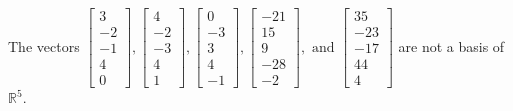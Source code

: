 \begin{exercise}
\begin{exerciseStatement}
  \end{exerciseStatement}
  \begin{exerciseAnswer}
   The vectors \(\left[\begin{array}{r}
3 \\
-2 \\
-1 \\
4 \\
0
\end{array}\right] , \left[\begin{array}{r}
4 \\
-2 \\
-3 \\
4 \\
1
\end{array}\right] , \left[\begin{array}{r}
0 \\
-3 \\
3 \\
4 \\
-1
\end{array}\right] , \left[\begin{array}{r}
-21 \\
15 \\
9 \\
-28 \\
-2
\end{array}\right] , \text{ and } \left[\begin{array}{r}
35 \\
-23 \\
-17 \\
44 \\
4
\end{array}\right]\) 
  	 are not  a basis of \(\mathbb{R}^5\).
  


  \end{exerciseAnswer}
\end{exercise}